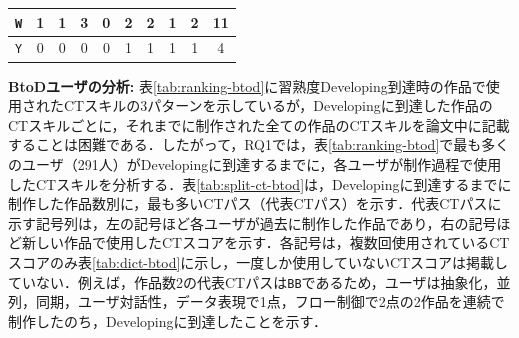 \documentclass[submit]{ipsj}
\begin{document}
\begin{table}[t]
\begin{minipage}[t]{0.5\linewidth}
{\begin{tabular}{c|c|cccccccc}
\texttt{\large{W}}                   & 1                                           & \multicolumn{1}{c|}{1} & \multicolumn{1}{c|}{3} & \multicolumn{1}{c|}{0} & \multicolumn{1}{c|}{2} & \multicolumn{1}{c|}{2} & \multicolumn{1}{c|}{1} & \multicolumn{1}{c|}{2} & 11 \\ \hline
\texttt{\large{Y}}                   & 0                                           & \multicolumn{1}{c|}{0} & \multicolumn{1}{c|}{0} & \multicolumn{1}{c|}{0} & \multicolumn{1}{c|}{1} & \multicolumn{1}{c|}{1} & \multicolumn{1}{c|}{1} & \multicolumn{1}{c|}{1} & 4  \\ \hline
\end{tabular}
}
  \end{minipage}
  \vspace{-4mm}
\end{table}

\noindent\textbf{BtoDユーザの分析:} 表\ref{tab:ranking-btod}に習熟度Developing到達時の作品で使用されたCTスキルの3パターンを示しているが，Developingに到達した作品のCTスキルごとに，それまでに制作された全ての作品のCTスキルを論文中に記載することは困難である．したがって，RQ1では，表\ref{tab:ranking-btod}で最も多くのユーザ（291人）がDevelopingに到達するまでに，各ユーザが制作過程で使用したCTスキルを分析する．表\ref{tab:split-ct-btod}は，Developingに到達するまでに制作した作品数別に，最も多いCTパス（代表CTパス）を示す．代表CTパスに示す記号列は，左の記号ほど各ユーザが過去に制作した作品であり，右の記号ほど新しい作品で使用したCTスコアを示す．各記号は，複数回使用されているCTスコアのみ表\ref{tab:dict-btod}に示し，一度しか使用していないCTスコアは掲載していない．例えば，作品数2の代表CTパスは\texttt{\large{BB}}であるため，ユーザは抽象化，並列，同期，ユーザ対話性，データ表現で1点，フロー制御で2点の2作品を連続で制作したのち，Developingに到達したことを示す．



\end{document}
